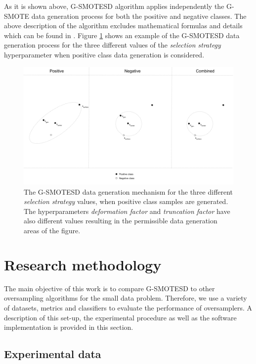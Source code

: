 \documentclass[parskip=full]{scrartcl}
\begin{document}
As it is shown above, G-SMOTESD algorithm applies independently the G-SMOTE data generation process for both the positive and negative classes. The above description of the algorithm excludes mathematical formulas and details which
can be found in \cite{Douzas.2019}. Figure \ref{fig:gsmotemechanism} shows an
example of the G-SMOTESD data generation process for the three different
values of the \textit{selection strategy} hyperparameter when positive class
data generation is considered.

\begin{figure}[H]
	\centering
	\includegraphics[width=1\linewidth]{../analysis/smote_mechanism.png}
	\caption{The G-SMOTESD data generation mechanism for the three  different \textit{selection strategy} values, when positive class samples are generated. The hyperparameters \textit{deformation factor} and \textit{truncation factor} have also different values resulting in the permissible data generation areas of the figure.}
	\label{fig:gsmotemechanism}
\end{figure}

\section{Research methodology}
\label{research}

The main objective of this work is to compare G-SMOTESD to other oversampling
algorithms for the small data problem. Therefore, we use a variety of datasets, metrics and classifiers to evaluate the performance of oversamplers. A description of this set-up, the experimental procedure as well as the software implementation is provided in this section.

\subsection{Experimental data}
\end{document}
